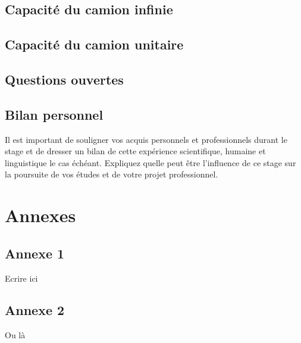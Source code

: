 \documentclass[twoside,11pt,openany,a4paper]{rapport}
\begin{document}
\chapter{Capacité du camion infinie}

\chapter{Capacité du camion unitaire}

\chapter{Questions ouvertes}

\chapter*{Bilan personnel}
Il est important de souligner vos acquis personnels et professionnels durant le stage et de  dresser un bilan de cette expérience scientifique, humaine et linguistique le cas échéant. Expliquez quelle peut être l’influence de ce stage sur la poursuite de vos études et de votre projet professionnel.




\backmatter

\appendix
\part{Annexes}
\chapter{Annexe 1}
Ecrire ici

\chapter{Annexe 2}
Ou là
\end{document}
